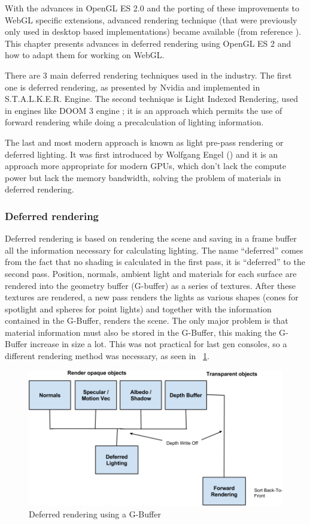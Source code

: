 With the advances in OpenGL ES 2.0 and the porting of these improvements to WebGL specific extensions, advanced rendering technique (that were previously only used in desktop based implementations) became available (from reference \cite{engel14}). This chapter presents advances in deferred rendering using OpenGL ES 2 and how to adapt them for working on WebGL. 

There are 3 main deferred rendering techniques used in the industry. The first one is deferred rendering, as presented by Nvidia and implemented in S.T.A.L.K.E.R. Engine. The second technique is Light Indexed Rendering, used in engines like DOOM 3 engine \cite{trebilco07}; it is an approach which permits the use of forward rendering while doing a precalculation of lighting information.

The last and most modern approach is known as light pre-pass rendering or deferred lighting. It was first introduced by Wolfgang Engel (\cite{engel08}) and it is an approach more appropriate for modern GPUs, which don’t lack the compute power but lack the memory bandwidth, solving the problem of materials in deferred rendering.

\subsubsection{Deferred rendering}

Deferred rendering is based on rendering the scene and saving in a frame buffer all the information necessary for calculating lighting. The name “deferred” comes from the fact that no shading is calculated in the first pass, it is “deferred” to the second pass. Position, normals, ambient light and materials for each surface are rendered into the geometry buffer (G-buffer) as a series of textures. After these textures are rendered, a new pass renders the lights as various shapes (cones for spotlight and spheres for point lights) and together with the information contained in the G-Buffer, renders the scene. The only major problem is that material information must also be stored in the G-Buffer, this making the G-Buffer increase in size a lot. This was not practical for last gen consoles, so a different rendering method was necessary, as seen in ~\ref{img:deferred2}.
\begin{center}
\begin{figure}[h!]
\includegraphics[width=\textwidth]{src/img/deferred2.png}
\caption{Deferred rendering using a G-Buffer}
\label{img:deferred2}
\end{figure}
\end{center}

